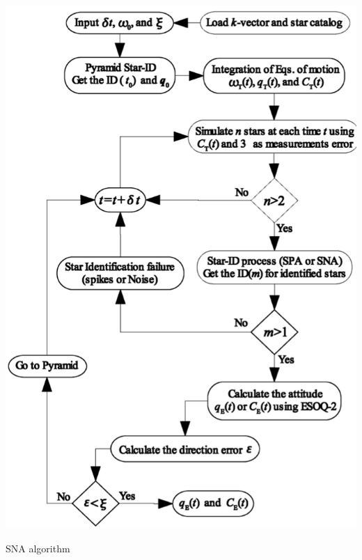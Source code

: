 \documentclass[../../main.tex]{subfiles}
\begin{document}
\begin{itemize}
    \begin{Flowchart}
        \centering
        \includegraphics[scale=0.55]{Figures/GNC/sna_flowchart.png}
        \caption{SNA algorithm}
        \label{fig:sna_flowchart}
    \end{Flowchart}
\end{itemize}
\end{document}
